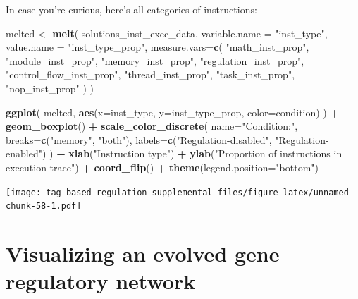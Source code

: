 \documentclass[
]{book}
\newenvironment{Shaded}{\begin{snugshade}}{\end{snugshade}}
\newcommand{\DataTypeTok}[1]{\textcolor[rgb]{0.13,0.29,0.53}{#1}}
\newcommand{\KeywordTok}[1]{\textcolor[rgb]{0.13,0.29,0.53}{\textbf{#1}}}
\newcommand{\NormalTok}[1]{#1}
\newcommand{\OperatorTok}[1]{\textcolor[rgb]{0.81,0.36,0.00}{\textbf{#1}}}
\newcommand{\StringTok}[1]{\textcolor[rgb]{0.31,0.60,0.02}{#1}}
\begin{document}
In case you're curious, here's all categories of instructions:

\begin{Shaded}
\begin{Highlighting}[]
\NormalTok{melted \textless{}{-}}\StringTok{ }\KeywordTok{melt}\NormalTok{(}
\NormalTok{  solutions\_inst\_exec\_data,}
  \DataTypeTok{variable.name =} \StringTok{"inst\_type"}\NormalTok{,}
  \DataTypeTok{value.name =} \StringTok{"inst\_type\_prop"}\NormalTok{,}
  \DataTypeTok{measure.vars=}\KeywordTok{c}\NormalTok{(}
    \StringTok{"math\_inst\_prop"}\NormalTok{,}
    \StringTok{"module\_inst\_prop"}\NormalTok{,}
    \StringTok{"memory\_inst\_prop"}\NormalTok{,}
    \StringTok{"regulation\_inst\_prop"}\NormalTok{,}
    \StringTok{"control\_flow\_inst\_prop"}\NormalTok{,}
    \StringTok{"thread\_inst\_prop"}\NormalTok{,}
    \StringTok{"task\_inst\_prop"}\NormalTok{,}
    \StringTok{"nop\_inst\_prop"}
\NormalTok{  )}
\NormalTok{)}

\KeywordTok{ggplot}\NormalTok{( melted, }\KeywordTok{aes}\NormalTok{(}\DataTypeTok{x=}\NormalTok{inst\_type, }\DataTypeTok{y=}\NormalTok{inst\_type\_prop, }\DataTypeTok{color=}\NormalTok{condition) ) }\OperatorTok{+}
\StringTok{  }\KeywordTok{geom\_boxplot}\NormalTok{() }\OperatorTok{+}
\StringTok{  }\KeywordTok{scale\_color\_discrete}\NormalTok{(}
    \DataTypeTok{name=}\StringTok{"Condition:"}\NormalTok{,}
    \DataTypeTok{breaks=}\KeywordTok{c}\NormalTok{(}\StringTok{"memory"}\NormalTok{, }\StringTok{"both"}\NormalTok{),}
    \DataTypeTok{labels=}\KeywordTok{c}\NormalTok{(}\StringTok{"Regulation{-}disabled"}\NormalTok{, }\StringTok{"Regulation{-}enabled"}\NormalTok{)}
\NormalTok{  ) }\OperatorTok{+}
\StringTok{  }\KeywordTok{xlab}\NormalTok{(}\StringTok{"Instruction type"}\NormalTok{) }\OperatorTok{+}
\StringTok{  }\KeywordTok{ylab}\NormalTok{(}\StringTok{"Proportion of instructions in execution trace"}\NormalTok{) }\OperatorTok{+}
\StringTok{  }\KeywordTok{coord\_flip}\NormalTok{() }\OperatorTok{+}
\StringTok{  }\KeywordTok{theme}\NormalTok{(}\DataTypeTok{legend.position=}\StringTok{"bottom"}\NormalTok{)}
\end{Highlighting}
\end{Shaded}

\texttt{[image: tag-based-regulation-supplemental\_files/figure-latex/unnamed-chunk-58-1.pdf]}

\hypertarget{visualizing-an-evolved-gene-regulatory-network}{%
\section{Visualizing an evolved gene regulatory network}\label{visualizing-an-evolved-gene-regulatory-network}}
\end{document}
